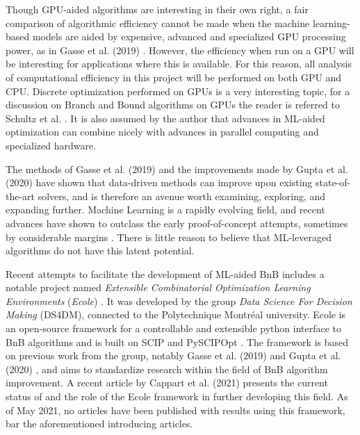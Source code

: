 Though \gls{GPU}-aided algorithms are interesting in their own right, a fair comparison of algorithmic efficiency cannot be made when the machine learning-based models are aided by expensive, advanced and specialized \gls{GPU} processing power, as in Gasse et al. (2019) \cite{gasse2019exact}. However, the efficiency when run on a \gls{GPU} will be interesting for applications where this is available. 
For this reason, all analysis of computational efficiency in this project will be performed on both \gls{GPU} and \gls{CPU}. Discrete optimization performed on \gls{GPU}s is a very interesting topic, for a discussion on Branch and Bound algorithms on \gls{GPU}s the reader is referred to Schultz et al. \cite{schulz2013gpu}. It is also assumed by the author that advances in ML-aided optimization can combine nicely with advances in parallel computing and specialized hardware.

The methods of Gasse et al. (2019) \cite{gasse2019exact} and the improvements made by Gupta et al. (2020) \cite{gupta2020hybrid} have shown that data-driven methods can improve upon existing state-of-the-art solvers, and is therefore an avenue worth examining, exploring, and expanding further. Machine Learning is a rapidly evolving field, and recent advances have shown to outclass the early proof-of-concept attempts, sometimes by considerable margins \cite{holzinger2018current}. There is little reason to believe that \gls{ML}-leveraged algorithms do not have this latent potential. %

Recent attempts to facilitate the development of \gls{ML}-aided \gls{BnB} includes a notable project named \textit{Extensible Combinatorial Optimization Learning Environments} (\emph{Ecole}) \cite{prouvost2020ecole, prouvost2021ecole}. It was developed by the group \textit{Data Science For Decision Making} (\gls{DS4DM}), connected to the Polytechnique Montr\'{e}al university. \gls{Ecole} is an open-source framework for a controllable and extensible python interface to \gls{BnB} algorithms and is built on \gls{SCIP} and PySCIPOpt \cite{prouvost2020ecole}. The framework is based on previous work from the group, notably Gasse et al. (2019) \cite{gasse2019exact} and Gupta et al. (2020) \cite{gupta2020hybrid}, and aims to standardize research within the field of \gls{BnB} algorithm improvement.  
 A recent article by
Cappart et al. (2021) \cite{cappart2021combinatorial} presents the current status of and the role of the \gls{Ecole} framework in further developing this field. 
As of May 2021, no articles have been published with results using this framework, bar the aforementioned introducing articles.



